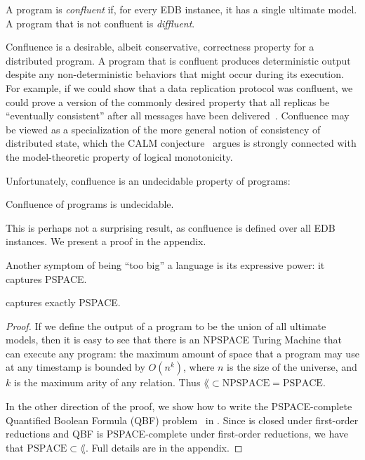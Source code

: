 \begin{definition}
  A \lang program is {\em confluent} if, for every EDB instance, it has a single ultimate model.  A program that is not confluent is {\em diffluent}.
\end{definition}


Confluence is a desirable, albeit conservative, correctness property for a
distributed program.  A program that is confluent produces deterministic output
despite any non-deterministic behaviors that might occur during its
execution. For example, if we could show that a data replication protocol was
confluent, we could prove a version of the commonly desired property that all
replicas be ``eventually consistent'' after all messages have been
delivered~\cite{bayou,vogels-ec}.  Confluence may be viewed as a specialization of the
more general notion of consistency of distributed state, which the CALM
conjecture~\cite{declarative-imperative} argues is strongly connected with the
model-theoretic property of logical monotonicity.

Unfortunately, confluence is an undecidable property of \lang programs:

\begin{lemma}
\label{lem:confluence-undecidable}
Confluence of \lang programs is undecidable.
\end{lemma}
This is perhaps not a surprising result, as confluence is defined over all EDB instances.  We present a proof in the appendix.


Another symptom of \lang being ``too big'' a language is its expressive power: it captures PSPACE.  

\begin{lemma}
\label{lem:lang-pspace}
\lang captures exactly PSPACE.
\end{lemma}

\begin{proof}
If we define the output of a \lang program to be the union of all ultimate models, then it is easy to see that there is an NPSPACE Turing Machine that can execute any \lang program: the maximum amount of space that a \lang program may use at any timestamp is bounded by $O(n^k)$, where $n$ is the size of the universe, and $k$ is the maximum arity of any relation.  Thus $\lang \subset \text{NPSPACE} = \text{PSPACE}$.

In the other direction of the proof, we show how to write the PSPACE-complete Quantified Boolean Formula (QBF) problem~\cite{garey-johnson} in \lang. Since \lang is closed under first-order reductions and QBF is PSPACE-complete under first-order reductions, we have that $\text{PSPACE} \subset \lang$.  Full details are in the appendix.
\end{proof}

